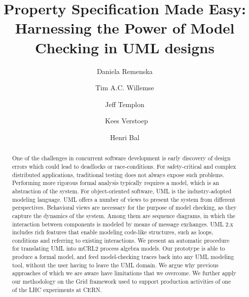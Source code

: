 \documentclass[letter]{llncs}
\begin{document}
\title{Property Specification Made Easy: Harnessing the Power of Model Checking in UML designs}

\author{Daniela Remenska
\and Tim A.C. Willemse \and Jeff Templon \and\
Kees Verstoep \and Henri Bal}
%


\maketitle

\begin{abstract}
One of the challenges in concurrent software development is early discovery of
design errors which could lead to deadlocks or race-conditions. For safety-critical and
complex distributed applications, traditional testing does not always expose
such problems. Performing more rigorous formal
analysis typically requires a model, which is an abstraction of the system. For
object-oriented software, UML is the industry-adopted modeling
language. UML offers a number of views to present the system from different
perspectives. Behavioral views are necessary for the purpose of model checking,
as they capture the dynamics of the system. Among them are sequence diagrams, in
which the interaction between components is modeled by means of message
exchanges. UML 2.x includes rich features that
enable modeling code-like structures, such as loops, conditions and referring to
existing interactions.
We present an automatic procedure for translating UML into mCRL2 process algebra
models. Our prototype is able to
produce a formal model, and feed model-checking traces back into any
UML modeling tool, without the user having to leave the UML domain. We argue why
previous approaches of which we are aware have limitations that we overcome. We
further apply our methodology on the Grid framework used to support production
activities of one of the LHC experiments at CERN.
\end{abstract}
\end{document}
